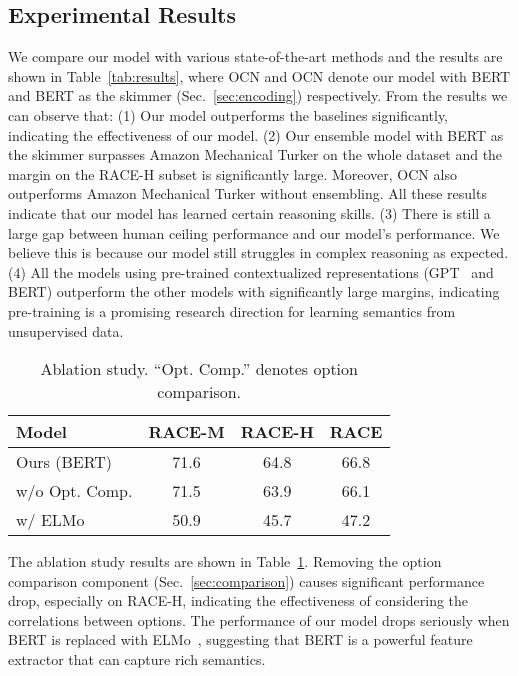\documentclass[11pt,a4paper]{article}
\newcommand\BERTBASE{BERT\xspace}
\newcommand\BERTLARGE{BERT\xspace}
\newcommand\OCNBASE{OCN\xspace}
\newcommand\OCNLARGE{OCN\xspace}
\begin{document}
\subsection{Experimental Results}
We compare our model with various state-of-the-art methods and the results are shown in Table~\ref{tab:results}, where \OCNBASE and \OCNLARGE denote our model with \BERTBASE and \BERTLARGE as the skimmer (Sec.~\ref{sec:encoding}) respectively.
From the results we can observe that:
(1) Our model outperforms the baselines significantly, indicating the effectiveness of our model.
(2) Our ensemble model with \BERTLARGE as the skimmer surpasses Amazon Mechanical Turker on the whole dataset and the margin on the RACE-H subset is significantly large. Moreover, \OCNLARGE also outperforms Amazon Mechanical Turker without ensembling. All these results indicate that our model has learned certain reasoning skills. 
(3) There is still a large gap between human ceiling performance and our model's performance. We believe this is because our model still struggles in complex reasoning as expected.
(4) All the models using pre-trained contextualized representations (GPT~\cite{OpenAIGPT} and BERT) outperform the other models with significantly large margins, indicating pre-training is a promising research direction for learning semantics from unsupervised data.


\begin{table}
	\centering
	\small
	\begin{tabular}{lccc}
		\toprule
		Model & RACE-M & RACE-H & RACE \\
		\midrule
		Ours (\BERTBASE) & 71.6 & 64.8 & 66.8 \\
		w/o Opt. Comp. & 71.5 & 63.9 &  66.1\\
		w/ ELMo & 50.9 & 45.7 & 47.2 \\
		\bottomrule
	\end{tabular}
	\caption{Ablation study. ``Opt. Comp.'' denotes option comparison.}
	\label{tab:ablation}
	\vspace{-1.1em}
\end{table}

The ablation study results are shown in Table~\ref{tab:ablation}. Removing the option comparison component (Sec.~\ref{sec:comparison}) causes significant performance drop, especially on RACE-H, indicating the effectiveness of considering the correlations between options. The performance of our model drops seriously when BERT is replaced with ELMo~\cite{elmo}, suggesting that BERT is a powerful feature extractor that can capture rich semantics.
\end{document}
